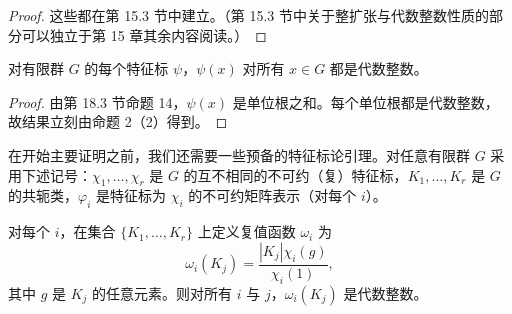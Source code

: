 \begin{proof}
这些都在第 15.3 节中建立。（第 15.3 节中关于整扩张与代数整数性质的部分可以独立于第 15 章其余内容阅读。）
\end{proof}

\begin{corollary}\label{cor:19.3}
对有限群 \(G\) 的每个特征标 \(\psi\)，\(\psi(x)\) 对所有 \(x \in G\) 都是代数整数。
\end{corollary}

\begin{proof}
由第 18.3 节命题 14，\(\psi(x)\) 是单位根之和。每个单位根都是代数整数，故结果立刻由命题 2（2）得到。
\end{proof}

在开始主要证明之前，我们还需要一些预备的特征标论引理。对任意有限群 \(G\) 采用下述记号：\(\chi_1, \ldots, \chi_r\) 是 \(G\) 的互不相同的不可约（复）特征标，\(K_1, \ldots, K_r\) 是 \(G\) 的共轭类，\(\varphi_i\) 是特征标为 \(\chi_i\) 的不可约矩阵表示（对每个 \(i\)）。

\begin{proposition}\label{pro:19.4}
对每个 \(i\)，在集合 \(\{K_1, \ldots, K_r\}\) 上定义复值函数 \(\omega_i\) 为
\[
\omega_i(K_j) = \frac{|K_j|\chi_i(g)}{\chi_i(1)},
\]
其中 \(g\) 是 \(K_j\) 的任意元素。则对所有 \(i\) 与 \(j\)，\(\omega_i(K_j)\) 是代数整数。
\end{proposition}

